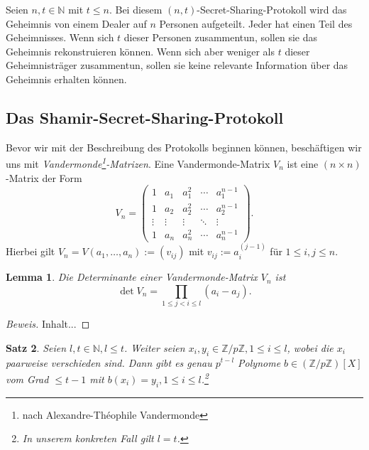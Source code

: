 \documentclass[12pt, a4paper, oneside, titlepage]{report}
\newcommand{\Z}{\mathds{Z}}
\newcommand{\N}{\mathds{N}}
\newtheorem{lemma}{Lemma}[section]
\newtheorem{satz}[lemma]{Satz}
\newenvironment{bew}{\begin{proof}[Beweis]}{\end{proof}}
\theoremstyle{definition}
\begin{document}
	Seien $ n, t \in \N $ mit $ t \leq n $. Bei diesem $ (n,t) $-Secret-Sharing-Protokoll wird das Geheimnis von einem Dealer auf $ n $ Personen aufgeteilt. Jeder hat einen Teil des Geheimnisses. Wenn sich $ t $ dieser Personen zusammentun, sollen sie das Geheimnis rekonstruieren können. Wenn sich aber weniger als $ t $ dieser Geheimnisträger zusammentun, sollen sie keine relevante Information über das Geheimnis erhalten können. \cite{buchmann}
	
	\subsection{Das Shamir-Secret-Sharing-Protokoll}
	
	Bevor wir mit der Beschreibung des Protokolls beginnen können, beschäftigen wir uns mit \emph{Vandermonde\footnote{nach Alexandre-Théophile Vandermonde}-Matrizen}. Eine Vandermonde-Matrix $ V_n $ ist eine $ (n \times n) $-Matrix der Form
	$$V_n =
	\begin{pmatrix}
	1 & a_1 & a_1^2 & \cdots & a_1^{n-1} \\
	1 & a_2 & a_2^2 & \cdots & a_2^{n-1} \\
	\vdots & \vdots & \vdots & \ddots & \vdots \\     
	1 & a_n & a_n^2 & \cdots & a_n^{n-1}
	\end{pmatrix}.$$
	Hierbei gilt $V_n = V(a_1, \dots, a_n) := (v_{ij}) $ mit $ v_{ij} := a_i^{(j-1)} $ für $ 1 \leq i, j \leq n$.
	\begin{lemma}
		Die Determinante einer Vandermonde-Matrix $ V_n $ ist
		$$ \det V_n = \prod_{1 \leq j < i \leq l} (a_i - a_j). $$
	\end{lemma}

	\begin{bew}
		Inhalt...
	\end{bew}
	
	\begin{satz}
		Seien $ l, t \in \N, l \leq t $. Weiter seien $ x_i, y_i \in \Z / p\Z, 1 \leq i \leq l $, wobei die $ x_i $ paarweise verschieden sind. Dann gibt es genau $ p^{t-l} $ Polynome $ b \in (\Z / p\Z)[X] $ vom Grad $ \leq t - 1 $ mit $ b(x_i) = y_i, 1 \leq i \leq l $.\footnote{In unserem konkreten Fall gilt $ l = t $.}
	\end{satz}
\end{document}
